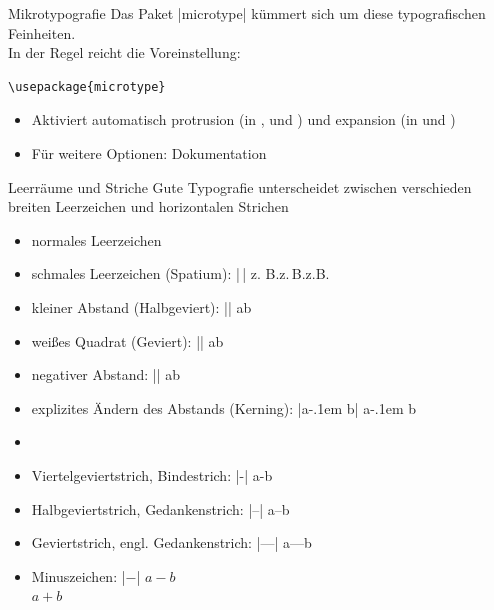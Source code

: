 \documentclass[
	vorläufig=true,
	datum=2016-10-28,
	titel={Allgemeine Formatierung und Pakete},
	web=false,
]{../tex/latexkurs-slides}
\begin{document}
\begin{frame}[fragile]{Mikrotypografie}
Das Paket |microtype| kümmert sich um diese typografischen Feinheiten.\\
In der Regel reicht die Voreinstellung:
\begin{lstlisting}
\usepackage{microtype}
\end{lstlisting}
\begin{itemize}
\item Aktiviert automatisch protrusion (in , \XeTeX und ) und expansion (in  und ) 
\item Für weitere Optionen: Dokumentation
\end{itemize}
\end{frame}

\begin{frame}[fragile]{Leerräume und Striche}
	Gute Typografie unterscheidet zwischen verschieden breiten Leerzeichen und horizontalen Strichen
			\begin{itemize}
				\item normales Leerzeichen
				\item schmales Leerzeichen (Spatium): |\,| \hfill z. B.\quad z.\,B.\quad z.B.
				\item kleiner Abstand (Halbgeviert): |\enskip| \hfill a\enskip b
				\item weißes Quadrat (Geviert): |\quad| \hfill a\quad b
				\item negativer Abstand: |\!| \hfill a\!b
				\pause
				\item explizites Ändern des Abstands (Kerning): |a\kern-.1em b| \hfill a\kern-.1em b
				\item[] \pause
				\item Viertelgeviertstrich, Bindestrich: |-| \hfill a-b
				\item Halbgeviertstrich, Gedankenstrich: |--| \hfill a–b
				\item Geviertstrich, engl. Gedankenstrich: |---| \hfill a—b
				\item Minuszeichen: |$-$| \hfill $a-b$\\\hfill $a+b$
			\end{itemize}
\end{frame}
\end{document}
